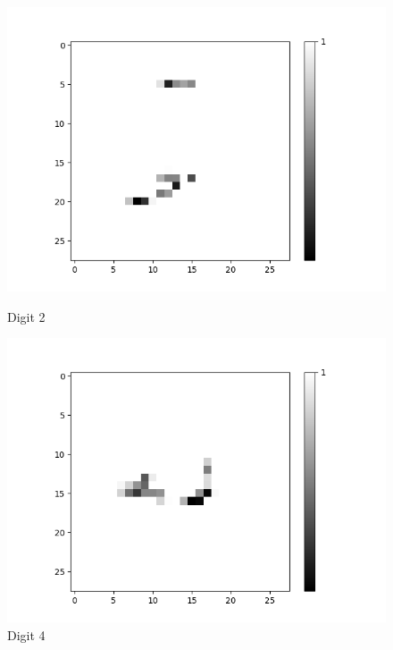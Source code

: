 \begin{figure}[H]
\begin{minipage}[b]{0.19\textwidth}
		\includegraphics[width=\textwidth]{AND-OLD(NO-LSM)/Layer0-Neuron-2.png}
		\caption{Digit 2}
	\end{minipage}
	\begin{minipage}[b]{0.19\textwidth}
		\captionsetup{labelformat=empty}
		\includegraphics[width=\textwidth]{AND-OLD(NO-LSM)/Layer0-Neuron-4.png}
		\caption{Digit 4}
	\end{minipage}
	\begin{minipage}[b]{0.19\textwidth}
		\captionsetup{labelformat=empty}

\end{minipage}
\end{figure}
